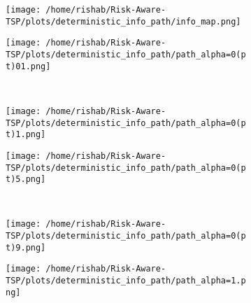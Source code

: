 \documentclass[conference]{IEEEtran}
\begin{document}
\begin{figure}[H]
  \begin{subfigure}{0.28\textwidth}
    \texttt{[image: /home/rishab/Risk-Aware-TSP/plots/deterministic\_info\_path/info\_map.png]}
    \caption{}
  \end{subfigure}%
  \hspace*{\fill}   %
  \begin{subfigure}{0.28\textwidth}
    \texttt{[image: /home/rishab/Risk-Aware-TSP/plots/deterministic\_info\_path/path\_alpha=0(pt)01.png]}
    \caption{}
  \end{subfigure}%
  \hspace*{\fill}   %
  \\
  
  \begin{subfigure}{0.28\textwidth}
    \texttt{[image: /home/rishab/Risk-Aware-TSP/plots/deterministic\_info\_path/path\_alpha=0(pt)1.png]}
    \caption{}
  \end{subfigure}%
  \hspace*{\fill}   %
  \begin{subfigure}{0.28\textwidth}
    \texttt{[image: /home/rishab/Risk-Aware-TSP/plots/deterministic\_info\_path/path\_alpha=0(pt)5.png]}
    \caption{}
  \end{subfigure}%
  \hspace*{\fill}
  \\
  
  \begin{subfigure}{0.28\textwidth}
    \texttt{[image: /home/rishab/Risk-Aware-TSP/plots/deterministic\_info\_path/path\_alpha=0(pt)9.png]}
    \caption{}
  \end{subfigure}%
  \hspace*{\fill}   %
  \begin{subfigure}{0.28\textwidth}
    \texttt{[image: /home/rishab/Risk-Aware-TSP/plots/deterministic\_info\_path/path\_alpha=1.png]}
    \caption{}
  \end{subfigure}%
  \hspace*{\fill}
\caption{}
\end{figure}
\end{document}
